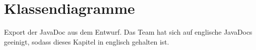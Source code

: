 \chapter{Klassendiagramme}
\label{ch:klassendiagramme}

Export der JavaDoc aus dem Entwurf. Das Team hat sich auf englische JavaDocs geeinigt, sodass dieses Kapitel in englisch gehalten ist.



%









%